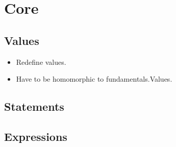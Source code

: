 \chapter{Core}

\section{Values}
\begin{itemize}
  \item Redefine values.
  \item Have to be homomorphic to fundamentals.Values.
\end{itemize}

\section{Statements}

\section{Expressions}

